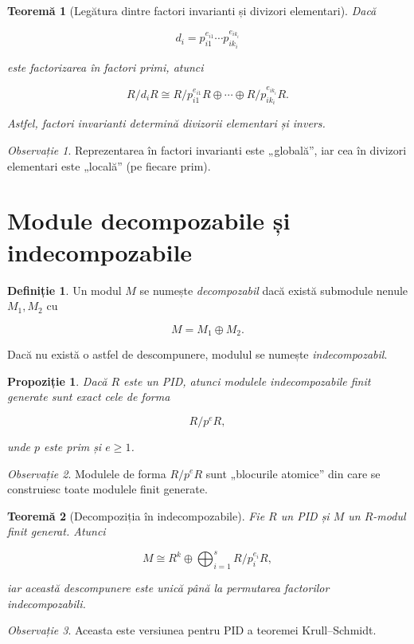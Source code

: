 \documentclass[12pt]{article}
\theoremstyle{definition}
\newtheorem{definition}{Definiție}
\theoremstyle{plain}
\newtheorem{theorem}{Teoremă}
\theoremstyle{remark}
\newtheorem{remark}{Observație}
\theoremstyle{plain}
\newtheorem{proposition}{Propoziție}
\begin{document}
\begin{theorem}[Legătura dintre factori invarianti și divizori elementari]
Dacă


\[
d_i = p_{i1}^{e_{i1}} \cdots p_{ik_i}^{e_{ik_i}}
\]


este factorizarea în factori primi, atunci


\[
R/d_iR \cong R/p_{i1}^{e_{i1}}R \oplus \cdots \oplus R/p_{ik_i}^{e_{ik_i}}R.
\]


Astfel, factori invarianti determină divizorii elementari și invers.
\end{theorem}

\begin{remark}
Reprezentarea în factori invarianti este „globală”, iar cea în divizori elementari este „locală” (pe fiecare prim).
\end{remark}

\section*{Module decompozabile și indecompozabile}

\begin{definition}
Un modul $M$ se numește \emph{decompozabil} dacă există submodule nenule $M_1, M_2$ cu


\[
M = M_1 \oplus M_2.
\]


Dacă nu există o astfel de descompunere, modulul se numește \emph{indecompozabil}.
\end{definition}

\begin{proposition}
Dacă $R$ este un PID, atunci modulele indecompozabile finit generate sunt exact cele de forma


\[
R/p^eR,
\]


unde $p$ este prim și $e \ge 1$.
\end{proposition}

\begin{remark}
Modulele de forma $R/p^eR$ sunt „blocurile atomice” din care se construiesc toate modulele finit generate.
\end{remark}

\begin{theorem}[Decompoziția în indecompozabile]
Fie $R$ un PID și $M$ un $R$-modul finit generat. Atunci


\[
M \cong R^k \oplus \bigoplus_{i=1}^s R/p_i^{e_i}R,
\]


iar această descompunere este unică până la permutarea factorilor indecompozabili.
\end{theorem}

\begin{remark}
Aceasta este versiunea pentru PID a teoremei Krull--Schmidt.
\end{remark}
\end{document}
